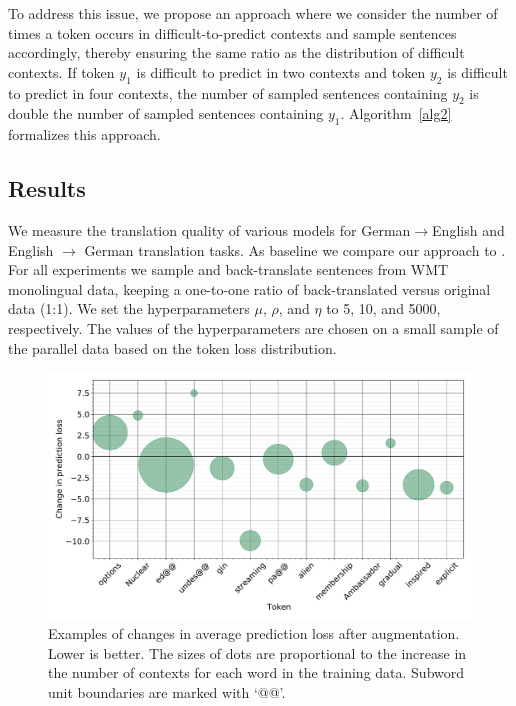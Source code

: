 To address this issue, we propose an approach where we consider the number of times a token occurs in difficult-to-predict contexts and sample sentences accordingly, thereby ensuring the same ratio as the distribution of difficult contexts.
If token $y_1$ is difficult to predict in two contexts and token $y_2$ is difficult to predict in four contexts, the number of sampled sentences containing $y_2$ is double the number of sampled sentences containing $y_1$.
Algorithm~\ref{alg2} formalizes this approach.
 


 \subsection{Results}
 
We measure the translation quality of various models for German$\rightarrow$English and English $\rightarrow$ German translation tasks.
As baseline we compare our approach to \citet{sennrich-haddow-birch:2016:P16-11}. 
For all experiments we sample and back-translate sentences from WMT monolingual data, keeping a one-to-one ratio of back-translated versus original data (\mbox{1:1}).
We set the hyperparameters $\mu$, $\rho$, and $\eta$ to 5, 10, and 5000, respectively.
The values of the hyperparameters are chosen on a small sample of the parallel data based on the token loss distribution. 

\begin{figure}[htb!]
\begin{center}
\includegraphics[width=\textwidth]{05-research-03/figs/changeinloss}
\caption{Examples of changes in average prediction loss after augmentation. Lower is better. The sizes of dots are proportional to the increase in the number of contexts for each word in the training data. Subword unit boundaries are marked with `@@'. \label{predlossexample}}
\end{center}
\end{figure}

